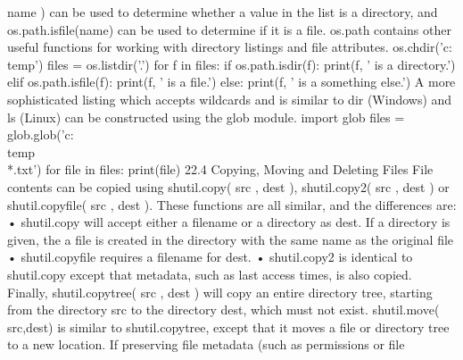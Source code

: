 name ) can be used to determine whether a value in the list is a directory, and os.path.isfile(name)
can be used to determine if it is a file. os.path contains other useful functions for working with directory
listings and file attributes.
os.chdir(’c:\\temp’)
files = os.listdir(’.’)
for f in files:
if os.path.isdir(f):
print(f, ’ is a directory.’)
elif os.path.isfile(f):
print(f, ’ is a file.’)
else:
print(f, ’ is a something else.’)
A more sophisticated listing which accepts wildcards and is similar to dir (Windows) and ls (Linux)
can be constructed using the glob module.
import glob
files = glob.glob(’c:\\temp\\*.txt’)
for file in files:
print(file)
22.4 Copying, Moving and Deleting Files
File contents can be copied using shutil.copy( src , dest ), shutil.copy2( src , dest ) or shutil.copyfile(
src , dest ). These functions are all similar, and the differences are:
• shutil.copy will accept either a filename or a directory as dest. If a directory is given, the a file is
created in the directory with the same name as the original file
• shutil.copyfile requires a filename for dest.
• shutil.copy2 is identical to shutil.copy except that metadata, such as last access times, is also
copied.
Finally, shutil.copytree( src , dest ) will copy an entire directory tree, starting from the directory src to
the directory dest, which must not exist. shutil.move( src,dest) is similar to shutil.copytree, except that
it moves a file or directory tree to a new location. If preserving file metadata (such as permissions or file
